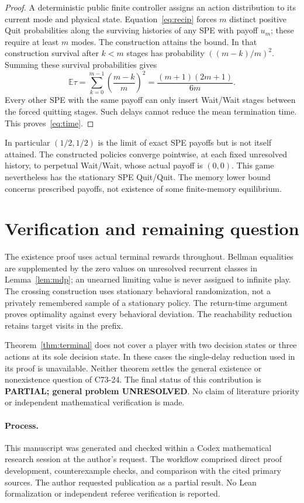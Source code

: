 \documentclass[11pt]{article}
\newcommand{\E}{\mathbb E}
\begin{document}
\begin{proof}
A deterministic public finite controller assigns an action distribution
to its current mode and physical state. Equation~\eqref{eq:recip} forces
$m$ distinct positive Quit probabilities along the surviving histories
of any SPE with payoff $u_m$; these require at least $m$ modes.
The construction attains the bound. In that construction survival
after $k<m$ stages has probability $((m-k)/m)^2$. Summing these survival
probabilities gives
\[
 \E\tau=\sum_{k=0}^{m-1}\left(\frac{m-k}{m}\right)^2
       =\frac{(m+1)(2m+1)}{6m}.
\]
Every other SPE with the same payoff can only insert Wait/Wait stages
between the forced quitting stages. Such delays cannot reduce the
mean termination time. This proves~\eqref{eq:time}.
\end{proof}

In particular $(1/2,1/2)$ is the limit of exact SPE payoffs but is not
itself attained. The constructed policies converge pointwise, at each
fixed unresolved history, to perpetual Wait/Wait, whose actual payoff
is $(0,0)$. This game nevertheless has the stationary SPE Quit/Quit.
The memory lower bound concerns prescribed payoffs, not existence of
some finite-memory equilibrium.

\section{Verification and remaining question}
The existence proof uses actual terminal rewards throughout. Bellman
equalities are supplemented by the zero values on unresolved recurrent
classes in Lemma~\ref{lem:mdp}; an unearned limiting value is never assigned
to infinite play. The crossing construction uses stationary behavioral
randomization, not a privately remembered sample of a stationary policy.
The return-time argument proves optimality against every behavioral
deviation. The reachability reduction retains target visits in the prefix.

Theorem~\ref{thm:terminal} does not cover a player with two decision states
or three actions at its sole decision state. In these cases the
single-delay reduction used in its proof is unavailable. Neither theorem
settles the general existence or nonexistence question of C73-24.
The final status of this contribution is \textbf{PARTIAL; general problem
UNRESOLVED}. No claim of literature priority or independent mathematical
verification is made.

\paragraph{Process.}
This manuscript was generated and checked within a Codex mathematical
research session at the author's request. The workflow comprised direct
proof development, counterexample checks, and comparison with the cited
primary sources. The author requested publication as a partial result.
No Lean formalization or independent referee verification is reported.
\end{document}
